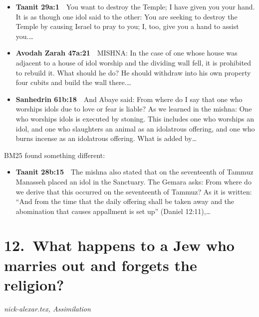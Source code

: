 \documentclass[11pt,a4paper]{article}
\begin{document}
\begin{itemize}[leftmargin=1.2em,itemsep=3pt]
\item {\color{ref}\textbf{Taanit 29a:1}}\ \ You want to destroy the Temple; I have given you your hand. It is as though one idol said to the other: You are seeking to destroy the Temple by causing Israel to pray to you; I, too, give you a hand to assist you.\ldots
\item {\color{ref}\textbf{Avodah Zarah 47a:21}}\ \ MISHNA: In the case of one whose house was adjacent to a house of idol worship and the dividing wall fell, it is prohibited to rebuild it. What should he do? He should withdraw into his own property four cubits and build the wall there.\ldots
\item {\color{ref}\textbf{Sanhedrin 61b:18}}\ \ And Abaye said: From where do I say that one who worships idols due to love or fear is liable? As we learned in the mishna: One who worships idols is executed by stoning. This includes one who worships an idol, and one who slaughters an animal as an idolatrous offering, and one who burns incense as an idolatrous offering. What is added by\ldots
\end{itemize}
{\color{quiet}\small BM25 found something different:}
\begin{itemize}[leftmargin=1.2em]
\item {\color{ref}\textbf{Taanit 28b:15}}\ \ The mishna also stated that on the seventeenth of Tammuz Manasseh placed an idol in the Sanctuary. The Gemara asks: From where do we derive that this occurred on the seventeenth of Tammuz? As it is written: “And from the time that the daily offering shall be taken away and the abomination that causes appallment is set up” (Daniel 12:11),\ldots
\end{itemize}

\section*{12.\ What happens to a Jew who marries out and forgets the religion?}
{\color{quiet}\small\textit{nick-alexar.tex, Assimilation}}
\end{document}
